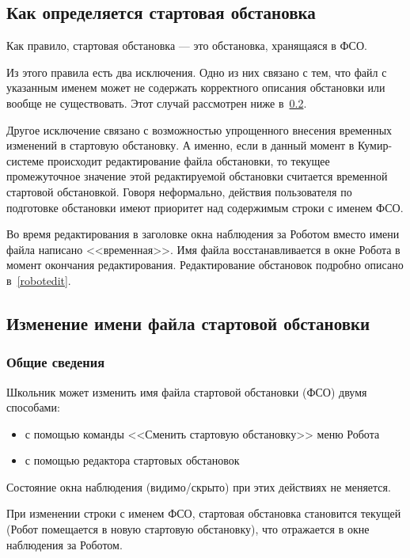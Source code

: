 \documentclass[12pt,a4paper]{article}
\begin{document}
\subsection{Как определяется стартовая обстановка}
\label{robotstartfielddefine}

Как правило, стартовая обстановка --- это обстановка, хранящаяся в ФСО.

Из этого правила есть два исключения. Одно из них связано с тем, что файл с указанным именем может не содержать корректного описания обстановки или вообще не существовать. Этот случай рассмотрен ниже в~\ref{robotchangefso}.

Другое исключение связано с возможностью упрощенного внесения временных изменений в стартовую обстановку. А именно, если в данный момент в Кумир-системе происходит редактирование файла обстановки, то текущее промежуточное значение этой редактируемой обстановки считается временной стартовой обстановкой. Говоря неформально, действия пользователя по подготовке обстановки имеют приоритет над содержимым строки с именем ФСО.

Во время редактирования в заголовке окна наблюдения за Роботом вместо имени файла написано <<временная>>. Имя файла восстанавливается в окне Робота в момент окончания редактирования. Редактирование обстановок подробно описано в~\ref{robotedit}.

\subsection{Изменение имени файла стартовой обстановки}
\label{robotchangefso}

\subsubsection{Общие сведения}

Школьник может изменить имя файла стартовой обстановки (ФСО) двумя способами:
\begin{itemize}
\item с помощью команды <<Сменить стартовую обстановку>> меню Робота
\item с помощью редактора стартовых обстановок
\end{itemize}
Состояние окна наблюдения (видимо/скрыто) при этих действиях не меняется.

При изменении строки с именем ФСО, стартовая обстановка становится текущей (Робот помещается в новую стартовую обстановку), что отражается в окне наблюдения за Роботом.
	
\end{document}
